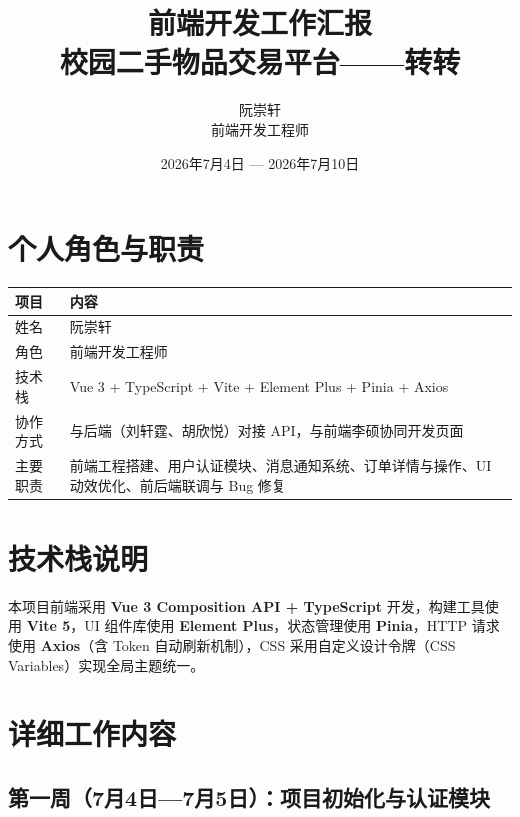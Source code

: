 \documentclass[12pt,a4paper]{ctexart}
\title{{\Huge 前端开发工作汇报}\\[0.3cm]{\Large 校园二手物品交易平台——转转}}
\author{{\large 阮崇轩}\\{\small 前端开发工程师}}
\date{2026年7月4日 — 2026年7月10日}
\begin{document}
\maketitle
\thispagestyle{fancy}

\section{个人角色与职责}

\begin{table}[H]
\centering
\begin{tabular}{lp{10cm}}
\toprule
\textbf{项目} & \textbf{内容} \\
\midrule
姓名 & 阮崇轩 \\
角色 & 前端开发工程师 \\
技术栈 & Vue 3 + TypeScript + Vite + Element Plus + Pinia + Axios \\
协作方式 & 与后端（刘轩霆、胡欣悦）对接 API，与前端李硕协同开发页面 \\
主要职责 & 前端工程搭建、用户认证模块、消息通知系统、订单详情与操作、UI 动效优化、前后端联调与 Bug 修复 \\
\bottomrule
\end{tabular}
\end{table}

\section{技术栈说明}

本项目前端采用 \textbf{Vue 3 Composition API + TypeScript} 开发，构建工具使用 \textbf{Vite 5}，UI 组件库使用 \textbf{Element Plus}，状态管理使用 \textbf{Pinia}，HTTP 请求使用 \textbf{Axios}（含 Token 自动刷新机制），CSS 采用自定义设计令牌（CSS Variables）实现全局主题统一。

\section{详细工作内容}

\subsection{第一周（7月4日—7月5日）：项目初始化与认证模块}
\end{document}

